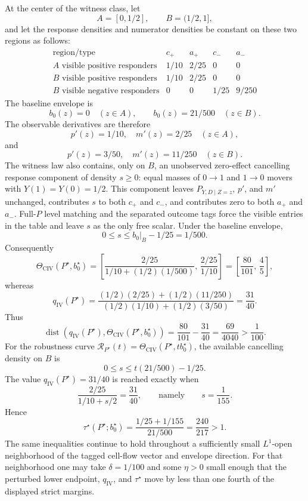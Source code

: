 \begin{theorem}
At the center of the witness class, let
\[
A=[0,1/2],\qquad B=(1/2,1],
\]
and let the response densities and numerator densities be constant on these two regions as follows:
\[
\begin{array}{c|c|c|c|c}
\text{region/type} & c_+ & a_+ & c_- & a_-\\
\hline
A\text{ visible positive responders} & 1/10 & 2/25 & 0 & 0\\
B\text{ visible positive responders} & 1/10 & 2/25 & 0 & 0\\
B\text{ visible negative responders} & 0 & 0 & 1/25 & 9/250
\end{array}
\]
The baseline envelope is
\[
b_0(z)=0\quad(z\in A),\qquad b_0(z)=21/500\quad(z\in B).
\]
The observable derivatives are therefore
\[
p'(z)=1/10,\quad m'(z)=2/25\quad(z\in A),
\]
and
\[
p'(z)=3/50,\quad m'(z)=11/250\quad(z\in B).
\]
The witness law also contains, only on \(B\), an unobserved zero-effect cancelling response component of density \(s\ge0\): equal masses of \(0\to1\) and \(1\to0\) movers with \(Y(1)=Y(0)=1/2\).  This component leaves \(P_{Y,D\mid Z=z}\), \(p'\), and \(m'\) unchanged, contributes \(s\) to both \(c_+\) and \(c_-\), and contributes zero to both \(a_+\) and \(a_-\).  Full-\(P\) level matching and the separated outcome tags force the visible entries in the table and leave \(s\) as the only free scalar.  Under the baseline envelope,
\[
0\le s\le b_0|_B-1/25=1/500.
\]
Consequently
\[
\Theta_{\mathrm{CIV}}(P^\star,b_0^\star)
=
\left[
\frac{2/25}{1/10+(1/2)(1/500)},\,
\frac{2/25}{1/10}
\right]
=
\left[\frac{80}{101},\,\frac45\right],
\]
whereas
\[
q_{\mathrm{IV}}(P^\star)
=
\frac{(1/2)(2/25)+(1/2)(11/250)}
     {(1/2)(1/10)+(1/2)(3/50)}
=\frac{31}{40}.
\]
Thus
\[
\operatorname{dist}\!\left(q_{\mathrm{IV}}(P^\star),
\Theta_{\mathrm{CIV}}(P^\star,b_0^\star)\right)
=
\frac{80}{101}-\frac{31}{40}
=\frac{69}{4040}
>\frac1{100}.
\]
For the robustness curve \(\mathcal R_{P^\star}(t)=\Theta_{\mathrm{CIV}}(P^\star,tb_0^\star)\), the available cancelling density on \(B\) is
\[
0\le s\le t(21/500)-1/25.
\]
The value \(q_{\mathrm{IV}}(P^\star)=31/40\) is reached exactly when
\[
\frac{2/25}{1/10+s/2}=\frac{31}{40},
\qquad\text{namely}\qquad s=\frac1{155}.
\]
Hence
\[
\tau^\star(P^\star;b_0^\star)
=
\frac{1/25+1/155}{21/500}
=\frac{240}{217}>1.
\]
The same inequalities continue to hold throughout a sufficiently small
\(L^1\)-open neighborhood of the tagged cell-flow vector and envelope direction.
For that neighborhood one may take \(\delta=1/100\) and some \(\eta>0\) small
enough that the perturbed lower endpoint, \(q_{\mathrm{IV}}\), and
\(\tau^\star\) move by less than one fourth of the displayed strict margins.
\end{theorem}

